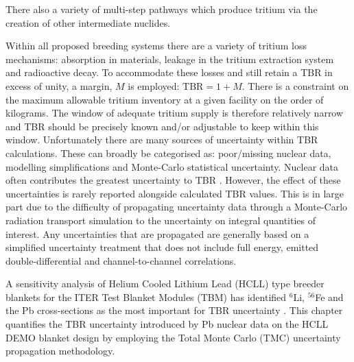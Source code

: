 There also a variety of multi-step pathways which produce tritium via the creation of other intermediate nuclides. 

Within all proposed breeding systems there are a variety of tritium loss mechanisms: absorption in materials, leakage in the tritium extraction system and radioactive decay. To accommodate these losses and still retain a TBR in excess of unity, a margin, $M$ is employed: $\mathrm{TBR} = 1 + M$. There is a constraint on the maximum allowable tritium inventory at a given facility on the order of kilograms. The window of adequate tritium supply is therefore relatively narrow and TBR should be precisely known and/or adjustable to keep within this window. Unfortunately there are many sources of uncertainty within TBR calculations. These can broadly be categorised as: poor/missing nuclear data, modelling simplifications and Monte-Carlo statistical uncertainty. Nuclear data often contributes the greatest uncertainty to TBR \cite{El-Guebaly2009}. However, the effect of these uncertainties is rarely reported alongside calculated TBR values. This is in large part due to the difficulty of propagating uncertainty data through a Monte-Carlo radiation transport simulation to the uncertainty on integral quantities of interest. Any uncertainties that are propagated are generally based on a simplified uncertainty treatment that does not include full energy, emitted double-differential and channel-to-channel correlations. 

A sensitivity analysis of Helium Cooled Lithium Lead (HCLL)  type breeder blankets for the ITER Test Blanket Modules (TBM)  has identified $^{6}$Li, $^{56}$Fe and the Pb cross-sections as the most important for TBR uncertainty \cite{Leichtle2011}. This chapter quantifies the TBR uncertainty introduced by Pb nuclear data on the HCLL DEMO blanket design by employing the Total Monte Carlo (TMC)  uncertainty propagation methodology.



